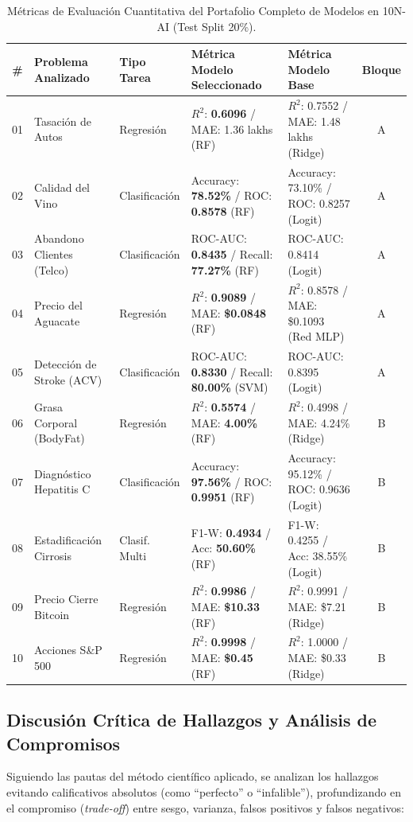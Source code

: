 \documentclass[12pt,letterpaper]{article}
\begin{document}
\begin{table}[h!]
\centering
\caption{Métricas de Evaluación Cuantitativa del Portafolio Completo de Modelos en 10N-AI (Test Split 20\%).}
\label{tab:metricas_completas}
\footnotesize
\begin{tabularx}{\textwidth}{c >{\raggedright\arraybackslash}X l >{\raggedright\arraybackslash}X >{\raggedright\arraybackslash}X c}
\toprule
\textbf{\#} & \textbf{Problema Analizado} & \textbf{Tipo Tarea} & \textbf{Métrica Modelo Seleccionado} & \textbf{Métrica Modelo Base} & \textbf{Bloque} \\
\midrule
01 & Tasación de Autos & Regresión & $R^2$: \textbf{0.6096} / MAE: 1.36 lakhs (RF) & $R^2$: 0.7552 / MAE: 1.48 lakhs (Ridge) & A \\
02 & Calidad del Vino & Clasificación & Accuracy: \textbf{78.52\%} / ROC: \textbf{0.8578} (RF) & Accuracy: 73.10\% / ROC: 0.8257 (Logit) & A \\
03 & Abandono Clientes (Telco) & Clasificación & ROC-AUC: \textbf{0.8435} / Recall: \textbf{77.27\%} (RF) & ROC-AUC: 0.8414 (Logit) & A \\
04 & Precio del Aguacate & Regresión & $R^2$: \textbf{0.9089} / MAE: \textbf{\$0.0848} (RF) & $R^2$: 0.8578 / MAE: \$0.1093 (Red MLP) & A \\
05 & Detección de Stroke (ACV) & Clasificación & ROC-AUC: \textbf{0.8330} / Recall: \textbf{80.00\%} (SVM) & ROC-AUC: 0.8395 (Logit) & A \\
\midrule
06 & Grasa Corporal (BodyFat) & Regresión & $R^2$: \textbf{0.5574} / MAE: \textbf{4.00\%} (RF) & $R^2$: 0.4998 / MAE: 4.24\% (Ridge) & B \\
07 & Diagnóstico Hepatitis C & Clasificación & Accuracy: \textbf{97.56\%} / ROC: \textbf{0.9951} (RF) & Accuracy: 95.12\% / ROC: 0.9636 (Logit) & B \\
08 & Estadificación Cirrosis & Clasif. Multi & F1-W: \textbf{0.4934} / Acc: \textbf{50.60\%} (RF) & F1-W: 0.4255 / Acc: 38.55\% (Logit) & B \\
09 & Precio Cierre Bitcoin & Regresión & $R^2$: \textbf{0.9986} / MAE: \textbf{\$10.33} (RF) & $R^2$: 0.9991 / MAE: \$7.21 (Ridge) & B \\
10 & Acciones S\&P 500 & Regresión & $R^2$: \textbf{0.9998} / MAE: \textbf{\$0.45} (RF) & $R^2$: 1.0000 / MAE: \$0.33 (Ridge) & B \\
\bottomrule
\end{tabularx}
\end{table}

\subsection{Discusión Crítica de Hallazgos y Análisis de Compromisos}
Siguiendo las pautas del método científico aplicado, se analizan los hallazgos evitando calificativos absolutos (como ``perfecto'' o ``infalible''), profundizando en el compromiso (\textit{trade-off}) entre sesgo, varianza, falsos positivos y falsos negativos:
\end{document}
